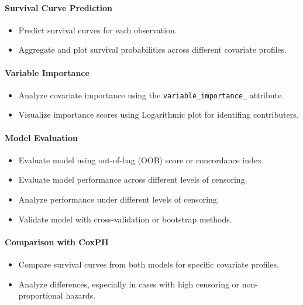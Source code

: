 \paragraph*{Survival Curve Prediction}
\begin{itemize}
    \item Predict survival curves for each observation.
    \item Aggregate and plot survival probabilities across different covariate profiles.
\end{itemize}

\paragraph*{Variable Importance}
\begin{itemize}
    \item Analyze covariate importance using the \texttt{variable\_importance\_} attribute.
    \item Visualize importance scores using Logarithmic plot for identifing contributers.
\end{itemize}

\paragraph*{Model Evaluation}
\begin{itemize}
    \item Evaluate model using out-of-bag (OOB) score or concordance index.
    \item Evaluate model performance across different levels of censoring.
    \item Analyze performance under different levels of censoring.
    \item Validate model with cross-validation or bootstrap methods.
\end{itemize}

\paragraph*{Comparison with CoxPH}
\begin{itemize}
    \item Compare survival curves from both models for specific covariate profiles.
    \item Analyze differences, especially in cases with high censoring or non-proportional hazards.
\end{itemize}

